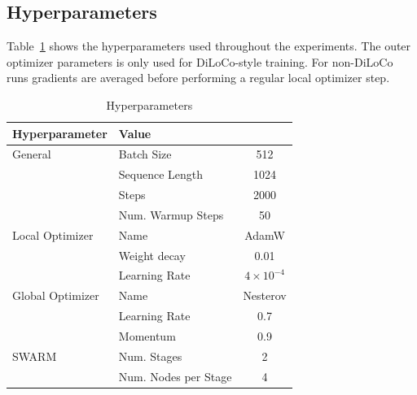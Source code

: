 \documentclass{article}
\begin{document}
\subsection{Hyperparameters}

Table~\ref{tab:hyperparameters} shows the hyperparameters used throughout the
experiments. The outer optimizer parameters is only used for DiLoCo-style
training. For non-DiLoCo runs gradients are averaged before performing a regular
local optimizer step.

\begin{table}[ht]
\small
\centering
\begin{tabular}{llc}
\toprule
\textbf{Hyperparameter} & \textbf{Value} \\ 
\midrule
\multirow{1}{*}{General} & Batch Size & 512 \\ 
& Sequence Length & 1024 \\ 
& Steps & 2000 \\
& Num. Warmup Steps & 50 \\ 
\hline
\multirow{1}{*}{Local Optimizer} & Name & AdamW \\ 
& Weight decay & 0.01 \\ 
& Learning Rate & $4 \times 10^{-4}$ \\ 
\hline
\multirow{1}{*}{Global Optimizer} & Name & Nesterov \\ 
& Learning Rate & 0.7 \\ 
& Momentum & 0.9 \\ 
\hline
\multirow{1}{*}{SWARM} & Num. Stages & 2  \\ 
& Num. Nodes per Stage & 4 \\
\bottomrule
\end{tabular}
\caption{Hyperparameters}
\label{tab:hyperparameters}
\end{table}
\end{document}
